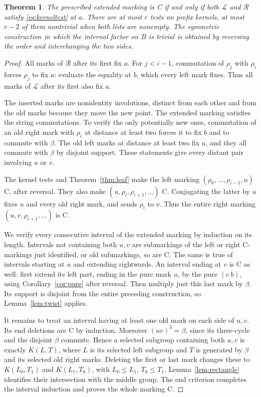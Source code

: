 \documentclass[a4paper,11pt]{article}
\newtheorem{theorem}{Theorem}\newtheorem{lemma}[theorem]{Lemma}
\begin{document}
\begin{theorem}\label{thm:split}
The prescribed extended marking is C if and only if both
$\mathcal L$ and $\mathcal R$ satisfy \eqref{eq:kerneltest} at $a$.
There are at most $r$ tests on prefix kernels, at most $r-2$ of them
nontrivial when both lists are nonempty. The symmetric construction in
which the internal factor on $B$ is trivial is obtained by reversing
the order and interchanging the two sides.
\end{theorem}
\begin{proof}
All marks of $\mathcal R$ after its first fix $a$. For $j<i-1$,
commutation of $\rho_j$ with $\rho_i$ forces $\rho_j$ to fix $a$:
evaluate the equality at $b$, which every left mark fixes. Thus all
marks of $\mathcal L$ after its first also fix $a$.

The inserted marks are nonidentity involutions, distinct from each other
and from the old marks because they move the new point.
The extended marking satisfies the string commutations. To verify the
only potentially new ones, commutation of an old right mark with
$\rho_i$ at distance at least two forces it to fix $b$ and to commute
with $\beta$. The old left marks at distance at least two fix $a$,
and they all commute with $\beta$ by disjoint support. These statements
give every distant pair involving $u$ or $v$.

The kernel tests and Theorem~\ref{thm:leaf} make the left marking
$(\rho_0,\ldots,\rho_{i-1},u)$ C, after reversal. They also make
$(u,\rho_i,\rho_{i+1},\ldots)$ C. Conjugating the latter by $u$
fixes $u$ and every old right mark, and sends $\rho_i$ to $v$.
Thus the entire right marking $(u,v,\rho_{i+1},\ldots)$ is C.

We verify every consecutive interval of the extended marking by induction
on its length. Intervals not containing both $u,v$ are submarkings of
the left or right C-markings just identified, or old submarkings, so
are C. The same is true of intervals starting at $u$ and extending
rightwards. An interval ending at $v$ is C as well: first extend its
left part, ending in the pure mark $u$, by the pure $(c\ b)$, using
Corollary~\ref{cor:pure} after reversal. Then multiply just this last
mark by $\beta$. Its support is disjoint from the entire preceding
construction, so Lemma~\ref{lem:twist} applies.

It remains to treat an interval having at least one old mark on each
side of $u,v$. Its end deletions are C by induction. Moreover
$(uv)^3=\beta$, since its three-cycle and the disjoint $\beta$
commute. Hence a selected subgroup containing both $u,v$ is exactly
$K(L,T)$, where $L$ is its selected left subgroup and $T$ is generated
by $\beta$ and its selected old right marks. Deleting the first or
last mark changes these to $K(L_0,T_1)$ and $K(L_1,T_0)$, with
$L_0\leq L_1$, $T_0\leq T_1$. Lemma~\ref{lem:rectangle} identifies
their intersection with the middle group. The end criterion completes
the interval induction and proves the whole marking C.


\end{proof}
\end{document}
